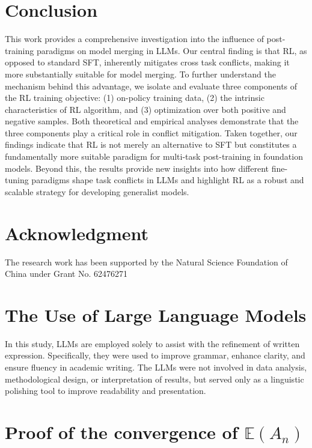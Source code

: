 \documentclass{article} %
\begin{document}
\section{Conclusion}
This work provides a comprehensive investigation into the influence of post-training paradigms on model merging in LLMs. Our central finding is that RL, as opposed to standard SFT, inherently mitigates cross task conflicts, making it more substantially suitable for model merging. 
To further understand the mechanism behind this advantage, we isolate and evaluate three components of the RL training objective: (1) on-policy training data, (2) the intrinsic characteristics of RL algorithm, and (3) optimization over both positive and negative samples. Both theoretical and empirical analyses demonstrate that the three components play a critical role in conflict mitigation. Taken together, our findings indicate that RL is not merely an alternative to SFT but constitutes a fundamentally more suitable paradigm for multi-task post-training in foundation models. Beyond this, the results provide new insights into how different fine-tuning paradigms shape task conflicts in LLMs and highlight RL as a robust and scalable strategy for developing generalist models.

\section{Acknowledgment}
The research work has been supported by the Natural Science Foundation of China under Grant No. 62476271



\newpage
\appendix

\section{The Use of Large Language Models }
In this study, LLMs are employed solely to assist with the refinement of written expression. Specifically, they were used to improve grammar, enhance clarity, and ensure fluency in academic writing. The LLMs were not involved in data analysis, methodological design, or interpretation of results, but served only as a linguistic polishing tool to improve readability and presentation.


\section{Proof of the convergence of $\mathbb{E}(A_n)$}
\end{document}
